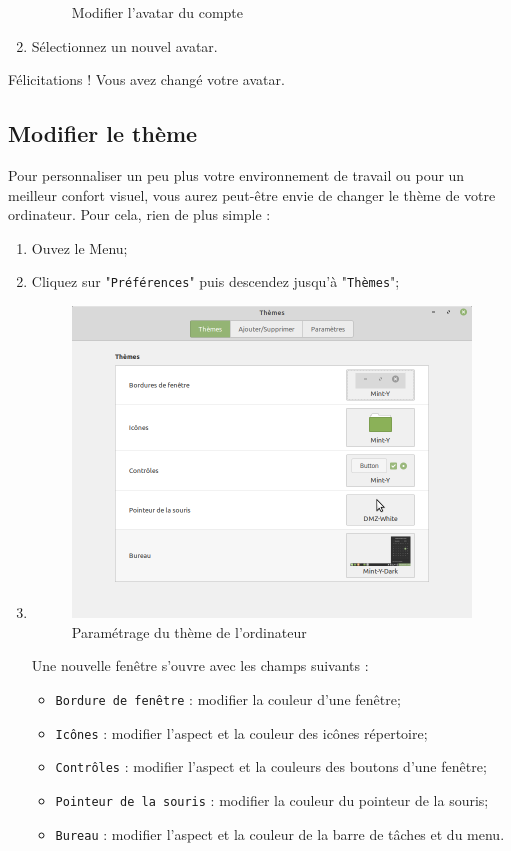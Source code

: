 \documentclass[12pt]{book}
\begin{document}
\begin{enumerate}
\begin{figure}[h]
				\caption{Modifier l'avatar du compte}
				\label{fig:avataruser}
			\end{figure}
			\item Sélectionnez un nouvel avatar.
		\end{enumerate}
		Félicitations ! Vous avez changé votre avatar.
	\subsection{Modifier le thème}\label{sec:theme}
		 Pour personnaliser un peu plus votre environnement de travail ou pour un meilleur confort visuel, vous aurez peut-être envie de changer le thème de votre ordinateur.
		 Pour cela, rien de plus simple :
		 \begin{enumerate}
		 	\item Ouvez le Menu;
		 	\item Cliquez sur "\texttt{Préférences}" puis descendez jusqu'à "\texttt{Thèmes}";
		 	\item 
		 	\begin{figure}[h]
		 		\centering
		 		\includegraphics[width=.8\textwidth]{include/themes.png}
		 		\caption{Paramétrage du thème de l'ordinateur}
		 		\label{fig:themes}
		 	\end{figure}
		 	Une nouvelle fenêtre s'ouvre avec les champs suivants :
		 	\begin{itemize}
		 		\item \texttt{Bordure de fenêtre} : modifier la couleur d'une fenêtre;
		 		\item \texttt{Icônes} : modifier l'aspect et la couleur des icônes répertoire;
		 		\item \texttt{Contrôles} : modifier l'aspect et la couleurs des boutons d'une fenêtre;
		 		\item \texttt{Pointeur de la souris} : modifier la couleur du pointeur de la souris;
		 		\item \texttt{Bureau} : modifier l'aspect et la couleur de la barre de tâches et du menu.
		 	\end{itemize}
		 \end{enumerate}
\end{document}
